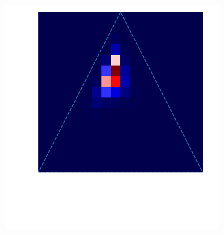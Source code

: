 \begin{figure}
\begin{minipage}{.3\textwidth}
\subcaption{}
\end{minipage}
 \begin{minipage}{.3\textwidth}
    \includegraphics[width=\textwidth]{triangle_1overfit.png}
\subcaption{}
\end{minipage}



\end{figure}
